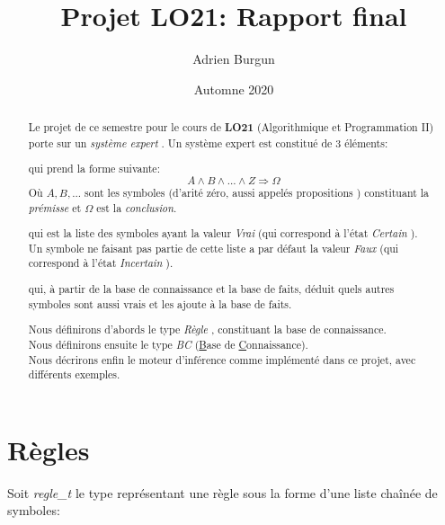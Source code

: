 \documentclass[12pt]{article}
\title{Projet LO21: Rapport final}
\author{Adrien Burgun}
\date{Automne 2020}
\begin{document}
\maketitle

\begin{abstract}

  Le projet de ce semestre pour le cours de \textbf{LO21} (Algorithmique et Programmation II) porte sur un \textit{\og système expert \fg}.
  Un système expert est constitué de 3 éléments:

  \begin{description}[align=left]
    \item [Une base de connaissance,] qui prend la forme suivante:
    \[
      A \wedge B \wedge ... \wedge Z \Rightarrow \Omega
    \]
    Où \(A, B, ...\) sont les symboles (d'arité zéro, aussi appelés \og propositions \fg) constituant la \textit{prémisse} et \(\Omega\) est la \textit{conclusion}.

    \item [Une base de faits,] qui est la liste des symboles ayant la valeur \textit{\og Vrai \fg} (qui correspond à l'état \textit{\og Certain \fg}). \\
    Un symbole ne faisant pas partie de cette liste a par défaut la valeur \textit{\og Faux \fg} (qui correspond à l'état \textit{\og Incertain \fg}).

    \item [Un moteur d'inférence,] qui, à partir de la base de connaissance et la base de faits, déduit quels autres symboles sont aussi vrais et les ajoute à la base de faits.
  \end{description}

  Nous définirons d'abords le type \textit{\og Règle \fg}, constituant la base de connaissance. \\
  Nous définirons ensuite le type \textit{\og BC \fg} (\underline{B}ase de \underline{C}onnaissance). \\
  Nous décrirons enfin le moteur d'inférence comme implémenté dans ce projet, avec différents exemples.
\end{abstract}

\section{Règles}

Soit \textit{regle\_t} le type représentant une règle sous la forme d'une liste chaînée de symboles:

\end{document}
